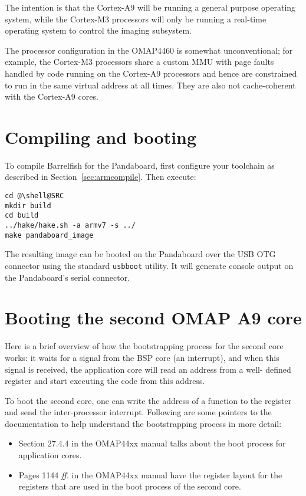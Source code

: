 \documentclass[a4paper,twoside]{report} %
\begin{document}
The intention is that the Cortex-A9 will be running a general purpose
operating system, while the Cortex-M3 processors will only be running
a real-time operating system to control the imaging subsystem.

The processor configuration in the OMAP4460 is somewhat
unconventional; for example, the Cortex-M3 processors share a
custom MMU with page faults handled by code running on the Cortex-A9
processors and hence are constrained to run in the same virtual
address at all times.  They are also not cache-coherent with the
Cortex-A9 cores. 

\section{Compiling and booting}

To compile Barrelfish for the Pandaboard, first configure your
toolchain as described in Section~\ref{sec:armcompile}. Then execute: 

\begin{lstlisting}
cd @\shell@SRC
mkdir build
cd build
../hake/hake.sh -a armv7 -s ../
make pandaboard_image
\end{lstlisting}

The resulting image can be booted on the Pandaboard over the USB OTG
connector using the standard \texttt{usbboot} utility.  It will
generate console output on the Pandaboard's serial connector.

\section{Booting the second OMAP A9 core}


Here is a brief overview of how the bootstrapping process for the second core
works: it waits for a signal from the BSP core (an interrupt), and when this
signal is received, the application core will read an address from a well-
defined register and start executing the code from this address.

To boot the second core, one can write the address of
a function to the register and send the inter-processor
interrupt. Following are some pointers to the documentation to help
understand the bootstrapping process in more detail:

\begin{itemize}
\item Section 27.4.4 in the OMAP44xx manual talks about the boot process for
  application cores.
\item Pages 1144 \textit{ff.} in the OMAP44xx manual have the register
  layout for the registers that are used in the boot process of the
  second core. 
\end{itemize}
\end{document}
